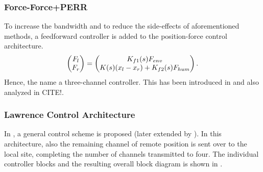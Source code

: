 \subsubsection{Force-Force+PERR}

To increase the bandwidth and to reduce the side-effects of aforementioned methods, a feedforward controller is added to the 
position-force control architecture. 
\[
\begin{pmatrix}F_l\\F_r\end{pmatrix} = \begin{pmatrix}K_{f1}(s)F_{env} \\ K(s) (x_l-x_r)+K_{f2}(s)F_{hum}\end{pmatrix}.
\]
Hence, the name a three-channel controller. This has been introduced in \cite{hashzaad1999} and also analyzed in CITE!.

\subsubsection{Lawrence Control Architecture}

In \cite{lawrence}, a general control scheme is proposed (later extended by \cite{salcudeanzhu,hzaadsalcu2}). In this architecture, 
also the remaining channel of remote position is sent over to the local site, completing the number of channels transmitted to four.
The individual controller blocks and the resulting overall block diagram is shown in .  

